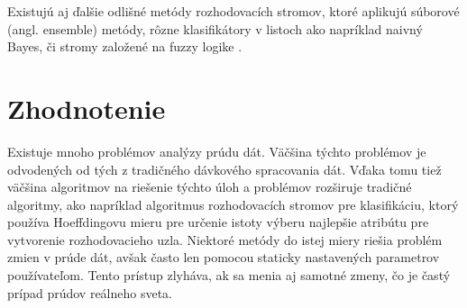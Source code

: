 \par
Existujú aj ďalšie odlišné metódy rozhodovacích stromov, ktoré aplikujú súborové (angl. ensemble) metódy, rôzne klasifikátory v listoch ako napríklad naivný Bayes, či stromy založené na fuzzy logike \citep{aggarwal2014survey}.

\section{Zhodnotenie}
Existuje mnoho problémov analýzy prúdu dát. Väčšina týchto problémov je odvodených od tých z tradičného dávkového spracovania dát. Vďaka tomu tiež väčšina algoritmov na riešenie týchto úloh a problémov rozširuje tradičné algoritmy, ako napríklad algoritmus rozhodovacích stromov pre klasifikáciu, ktorý používa Hoeffdingovu mieru pre určenie istoty výberu najlepšie atribútu pre vytvorenie rozhodovacieho uzla. Niektoré metódy do istej miery riešia problém zmien v prúde dát, avšak často len pomocou staticky nastavených parametrov používateľom. Tento prístup zlyháva, ak sa menia aj samotné zmeny, čo je častý prípad prúdov reálneho sveta.


